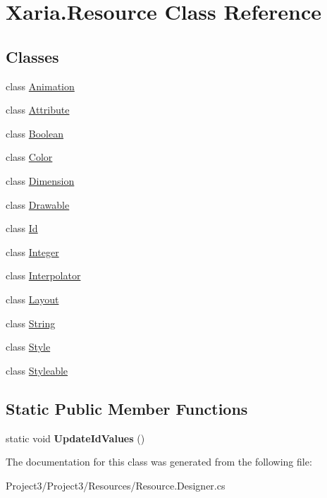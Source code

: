 \hypertarget{classXaria_1_1Resource}{}\section{Xaria.\+Resource Class Reference}
\label{classXaria_1_1Resource}
\subsection*{Classes}
\begin{DoxyCompactItemize}
\item 
class \hyperlink{classXaria_1_1Resource_1_1Animation}{Animation}
\item 
class \hyperlink{classXaria_1_1Resource_1_1Attribute}{Attribute}
\item 
class \hyperlink{classXaria_1_1Resource_1_1Boolean}{Boolean}
\item 
class \hyperlink{classXaria_1_1Resource_1_1Color}{Color}
\item 
class \hyperlink{classXaria_1_1Resource_1_1Dimension}{Dimension}
\item 
class \hyperlink{classXaria_1_1Resource_1_1Drawable}{Drawable}
\item 
class \hyperlink{classXaria_1_1Resource_1_1Id}{Id}
\item 
class \hyperlink{classXaria_1_1Resource_1_1Integer}{Integer}
\item 
class \hyperlink{classXaria_1_1Resource_1_1Interpolator}{Interpolator}
\item 
class \hyperlink{classXaria_1_1Resource_1_1Layout}{Layout}
\item 
class \hyperlink{classXaria_1_1Resource_1_1String}{String}
\item 
class \hyperlink{classXaria_1_1Resource_1_1Style}{Style}
\item 
class \hyperlink{classXaria_1_1Resource_1_1Styleable}{Styleable}
\end{DoxyCompactItemize}
\subsection*{Static Public Member Functions}
\begin{DoxyCompactItemize}
\item 
\mbox{\label{classXaria_1_1Resource_ab30fea2a262c8a8e677423be1429f52c}} 
static void {\bfseries Update\+Id\+Values} ()
\end{DoxyCompactItemize}


The documentation for this class was generated from the following file\+:\begin{DoxyCompactItemize}
\item 
Project3/\+Project3/\+Resources/Resource.\+Designer.\+cs\end{DoxyCompactItemize}
